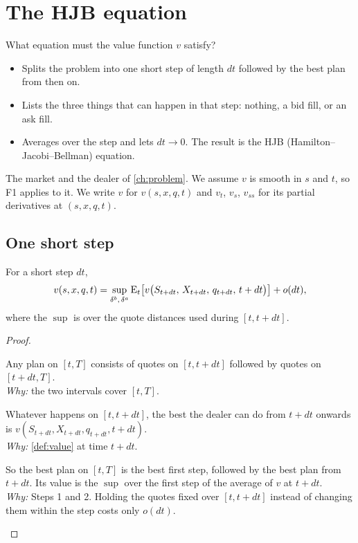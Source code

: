 \chapter{The HJB equation}
\label{ch:hjb}

\begin{question}
What equation must the value function $v$ satisfy?
\end{question}

\begin{whatfor}
\begin{itemize}
  \item Splits the problem into one short step of length $dt$ followed by the best plan from then on.
  \item Lists the three things that can happen in that step: nothing, a bid fill, or an ask fill.
  \item Averages over the step and lets $dt\to0$. The result is the HJB (Hamilton--Jacobi--Bellman) equation.
\end{itemize}
\end{whatfor}

\begin{setup}[Setup]
The market and the dealer of \cref{ch:problem}. We assume $v$ is smooth in $s$ and $t$, so F1 applies to it. We write $v$ for $v(s,x,q,t)$ and $v_t$, $v_s$, $v_{ss}$ for its partial derivatives at $(s,x,q,t)$.
\end{setup}

\section{One short step}

\begin{result}
\label{res:dpp}
For a short step $dt$,
\[
  v(s,x,q,t)=\sup_{\delta^b,\,\delta^a}\operatorname{E}_t\!\left[v\big(S_{t+dt},\,X_{t+dt},\,q_{t+dt},\,t+dt\big)\right]+o(dt),
\]
where the $\sup$ is over the quote distances used during $[t,t+dt]$.
\end{result}

\begin{proof}
\begin{steps}
  \item Any plan on $[t,T]$ consists of quotes on $[t,t+dt]$ followed by quotes on $[t+dt,T]$.
  \\ \emph{Why:} the two intervals cover $[t,T]$.
  \item Whatever happens on $[t,t+dt]$, the best the dealer can do from $t+dt$ onwards is $v(S_{t+dt},X_{t+dt},q_{t+dt},t+dt)$.
  \\ \emph{Why:} \cref{def:value} at time $t+dt$.
  \item So the best plan on $[t,T]$ is the best first step, followed by the best plan from $t+dt$. Its value is the $\sup$ over the first step of the average of $v$ at $t+dt$.
  \\ \emph{Why:} Steps 1 and 2. Holding the quotes fixed over $[t,t+dt]$ instead of changing them within the step costs only $o(dt)$.
\end{steps}
\end{proof}

